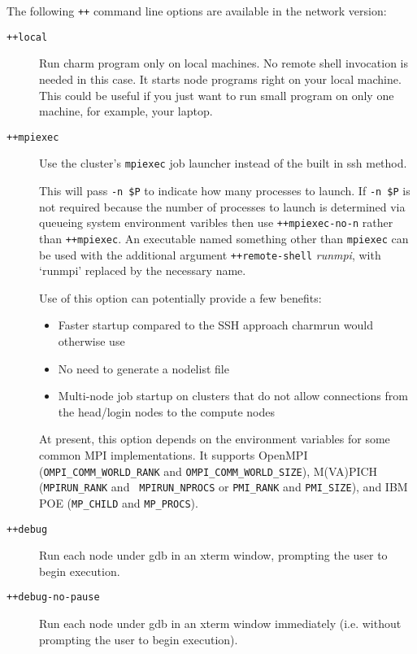 The following {\tt ++} command line options are available in
the network version:
\begin{description}

\item[{\tt ++local}] Run charm program only on local machines. No
 remote shell invocation is needed in this case. It starts node programs
 right on your local machine. This could be useful if you just want to
 run small program on only one machine, for example, your laptop.


\item[{\tt ++mpiexec}]
\label{mpiexec}
Use the cluster's {\tt mpiexec} job launcher instead of the built in ssh
method.

This will pass {\tt -n \$P} to indicate how many processes to
launch.
If {\tt -n \$P} is not required because the number of processes
to launch is determined via queueing system environment varibles
then use {\tt ++mpiexec-no-n} rather than {\tt ++mpiexec}.
An executable named something other than {\tt mpiexec} can be
used with the additional argument {\tt ++remote-shell} {\it runmpi},
with `runmpi' replaced by the necessary name.

Use of this option can potentially provide a few benefits:

\begin{itemize}
\item Faster startup compared to the SSH approach charmrun would
  otherwise use
\item No need to generate a nodelist file
\item Multi-node job startup on clusters that do not allow connections
  from the head/login nodes to the compute nodes
\end{itemize}

At present, this option depends on the environment variables for some
common MPI implementations. It supports OpenMPI ({\tt OMPI\_COMM\_WORLD\_RANK} and
{\tt OMPI\_COMM\_WORLD\_SIZE}), M(VA)PICH ({\tt MPIRUN\_RANK} and {\tt
  MPIRUN\_NPROCS} or {\tt PMI\_RANK} and {\tt PMI\_SIZE}),
and IBM POE ({\tt MP\_CHILD} and {\tt MP\_PROCS}).

\item[{\tt ++debug}] Run each node under gdb in an xterm window, prompting
the user to begin execution.

\item[{\tt ++debug-no-pause}] Run each node under gdb in an xterm window
immediately (i.e. without prompting the user to begin execution).


\end{description}
